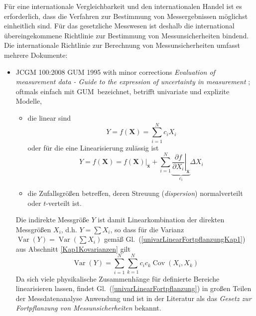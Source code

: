 Für eine internationale Vergleichbarkeit und den internationalen Handel ist es erforderlich,
dass die Verfahren zur Bestimmung von Messergebnissen möglichst einheitlich sind.
Für das gesetzliche Messwesen ist deshalb die international übereingekommene Richtlinie
zur Bestimmung von Messunsicherheiten bindend.
Die internationale Richtlinie zur Berechnung von Messunsicherheiten umfasst mehrere
Dokumente:
\begin{itemize}
\item JCGM 100:2008 GUM 1995 with minor corrections \textsl{Evaluation of measurement
data - Guide to the expression of uncertainty in measurement} \cite{GUM95}; oftmals einfach mit \glqq GUM\grqq ~bezeichnet,
betrifft univariate und explizite Modelle,
  \begin{itemize}
  \item die linear sind
  \begin{equation}
  Y = f(\mathbf{X}) = \sum_{i=1}^N c_i X_i
  \label{univarLinear}
  \end{equation}
  oder für die eine Linearisierung zulässig ist
  \begin{equation}
  Y = f(\mathbf{X})
  = \left. f(\mathbf{X}) \right|_{\bar{\mathbf{x}}} +
    \sum_{i=1}^N \underbrace{\left. \frac{\partial f}{\partial X_i} \right|_{\bar{\mathbf{x}}}}_{c_i} \Delta X_i
  \label{univarTaylorLin}
  \end{equation}
  \item die Zufallsgrößen betreffen, deren Streuung (\textsl{dispersion}) normalverteilt oder
  $t$-verteilt ist.
  \end{itemize}
Die indirekte Messgröße $Y$ ist damit Linearkombination der direkten Messgrößen $X_i$, d.h.
$Y = \sum X_i$, so dass für die Varianz $\operatorname{Var}(Y) = \operatorname{Var}(\sum X_i)$
gemäß Gl.~(\ref{univarLinearFortpflanzungKap1}) aus Abschnitt \ref{Kap1Kovarianzen} gilt
\begin{equation}
\operatorname{Var}(Y) = \sum_{i=1}^N \sum_{k=1}^N  c_i c_k \operatorname{Cov}(X_i, X_k)
\label{univarLinearFortpflanzung}
\end{equation}
Da sich viele physikalische Zusammenhänge für definierte Bereiche linearisieren lassen,
findet Gl.~(\ref{univarLinearFortpflanzung}) in großen Teilen der Messdatenanalyse
Anwendung und ist in der Literatur als das \textsl{Gesetz zur Fortpflanzung von Messunsicherheiten}
bekannt.


\end{itemize}
